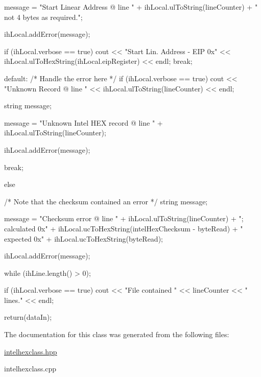 \begin{DoxyCode}
{{{{{{                            message = "Start Linear Address @ line " +
                                      ihLocal.ulToString(lineCounter) + 
                                      " not 4 bytes as required.";
                            
                            ihLocal.addError(message);
                        }
                        if (ihLocal.verbose == true)
                        {
                            cout << "Start Lin. Address - EIP 0x" <<
                                 ihLocal.ulToHexString(ihLocal.eipRegister) 
                                                                        << endl;
                        }
                        break;
                    
                    default:
                        /* Handle the error here                              */
                        if (ihLocal.verbose == true)
                        {
                            cout << "Unknown Record @ line " << 
                                        ihLocal.ulToString(lineCounter) << endl;
                        }
                        
                        
                        string message;
                            
                        message = "Unknown Intel HEX record @ line " +
                                  ihLocal.ulToString(lineCounter);
                        
                        ihLocal.addError(message);
                        
                        break;
                }
            }
            else
            {
                /* Note that the checksum contained an error                  */
                string message;
                            
                message = "Checksum error @ line " + 
                          ihLocal.ulToString(lineCounter) + 
                          "; calculated 0x" + 
                          ihLocal.ucToHexString(intelHexChecksum - byteRead) +
                          " expected 0x" + 
                          ihLocal.ucToHexString(byteRead);
                
                ihLocal.addError(message);
            }
        }
    } while (ihLine.length() > 0);
    
    if (ihLocal.verbose == true)
    {
        cout << "File contained " << lineCounter << " lines." << endl;
    }
    
    return(dataIn);
}
\end{DoxyCode}




The documentation for this class was generated from the following files:\begin{DoxyCompactItemize}
\item 
\hyperlink{intelhexclass_8hpp}{intelhexclass.hpp}\item 
intelhexclass.cpp\end{DoxyCompactItemize}
